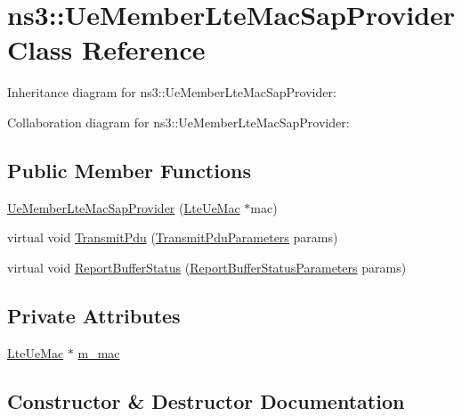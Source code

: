 \hypertarget{classns3_1_1UeMemberLteMacSapProvider}{}\section{ns3\+:\+:Ue\+Member\+Lte\+Mac\+Sap\+Provider Class Reference}
\label{classns3_1_1UeMemberLteMacSapProvider}


Inheritance diagram for ns3\+:\+:Ue\+Member\+Lte\+Mac\+Sap\+Provider\+:


Collaboration diagram for ns3\+:\+:Ue\+Member\+Lte\+Mac\+Sap\+Provider\+:
\subsection*{Public Member Functions}
\begin{DoxyCompactItemize}
\item 
\hyperlink{classns3_1_1UeMemberLteMacSapProvider_aeb72beb3a46fe0b4d57f27b9bafcfb72}{Ue\+Member\+Lte\+Mac\+Sap\+Provider} (\hyperlink{classns3_1_1LteUeMac}{Lte\+Ue\+Mac} $\ast$mac)
\item 
virtual void \hyperlink{classns3_1_1UeMemberLteMacSapProvider_aae23ffc374a8fb6ffc493a7138ee8d90}{Transmit\+Pdu} (\hyperlink{structns3_1_1LteMacSapProvider_1_1TransmitPduParameters}{Transmit\+Pdu\+Parameters} params)
\item 
virtual void \hyperlink{classns3_1_1UeMemberLteMacSapProvider_ad54a3a7e1d13643559bb9ff2a7b19aef}{Report\+Buffer\+Status} (\hyperlink{structns3_1_1LteMacSapProvider_1_1ReportBufferStatusParameters}{Report\+Buffer\+Status\+Parameters} params)
\end{DoxyCompactItemize}
\subsection*{Private Attributes}
\begin{DoxyCompactItemize}
\item 
\hyperlink{classns3_1_1LteUeMac}{Lte\+Ue\+Mac} $\ast$ \hyperlink{classns3_1_1UeMemberLteMacSapProvider_a22c8e884743aad53d1f567008f9055c8}{m\+\_\+mac}
\end{DoxyCompactItemize}


\subsection{Constructor \& Destructor Documentation}
